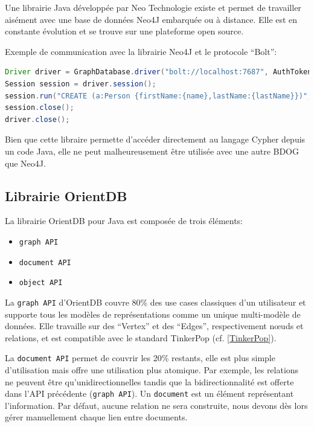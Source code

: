 \documentclass[a4paper,fleqn,12pt,oneside]{book}
\begin{document}
Une librairie Java développée par Neo Technologie existe et permet de travailler aisément avec une base de données Neo4J embarquée ou à distance. Elle est en constante évolution et se trouve sur une plateforme open source. 

Exemple de communication avec la librairie Neo4J et le protocole \enquote{Bolt}:
\vspace{0.6cm}
\begin{lstlisting}[language=java]
Driver driver = GraphDatabase.driver("bolt://localhost:7687", AuthTokens.basic("matrix", "neo"));
Session session = driver.session();
session.run("CREATE (a:Person {firstName:{name},lastName:{lastName}})", parameters("firstName","Gilles","lastName","Bodart"));
session.close();
driver.close();

\end{lstlisting}

Bien que cette libraire permette d'accéder directement au langage Cypher depuis un code Java, elle ne peut malheureusement être utilisée avec une autre BDOG que Neo4J. 

\subsection{Librairie OrientDB}

La librairie OrientDB pour Java est composée de trois éléments:

\begin{itemize}
\item[•] \texttt{graph API}
\item[•] \texttt{document API}
\item[•] \texttt{object API}
\end{itemize}

La \texttt{graph API} d'OrientDB couvre 80\% des use cases classiques d'un utilisateur et supporte tous les modèles de représentations comme un unique multi-modèle de données. Elle travaille sur des \enquote{Vertex} et des \enquote{Edges}, respectivement nœuds et relations, et est compatible avec le standard TinkerPop (cf. \ref{TinkerPop}).

La \texttt{document API} permet de couvrir les 20\% restants, elle est plus simple d'utilisation mais offre une utilisation plus atomique. Par exemple, les relations ne peuvent être qu'unidirectionnelles tandis que la bidirectionnalité est offerte dans l'API précédente (\texttt{graph API}). Un \texttt{document} est un élément représentant l'information. Par défaut, aucune relation ne sera construite, nous devons dès lors gérer manuellement chaque lien entre documents.
\end{document}
